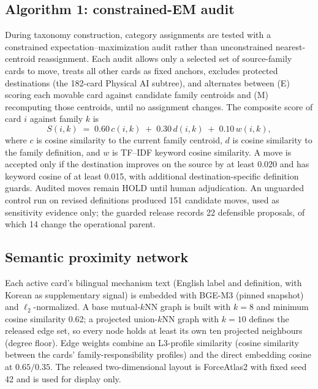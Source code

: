 \documentclass[fleqn,10pt]{wlscirep}
\begin{document}
\subsection*{Algorithm 1: constrained-EM audit}

During taxonomy construction, category assignments are tested with a
constrained expectation--maximization audit rather than unconstrained
nearest-centroid reassignment. Each audit allows only a selected set of
source-family cards to move, treats all other cards as fixed anchors,
excludes protected destinations (the 182-card Physical AI subtree), and
alternates between (E) scoring each movable card against candidate family
centroids and (M) recomputing those centroids, until no assignment changes.
The composite score of card $i$ against family $k$ is
\begin{equation}
S(i,k) \;=\; 0.60\,c(i,k) \;+\; 0.30\,d(i,k) \;+\; 0.10\,w(i,k),
\end{equation}
where $c$ is cosine similarity to the current family centroid, $d$ is cosine
similarity to the family definition, and $w$ is TF--IDF keyword cosine
similarity. A move is accepted only if the destination improves on the source
by at least 0.020 and has keyword cosine of at least 0.015, with additional
destination-specific definition guards. Audited moves remain HOLD until
human adjudication. An unguarded control run on revised definitions produced
151 candidate moves, used as sensitivity evidence only; the guarded release
records 22 defensible proposals, of which 14 change the operational parent.

\subsection*{Semantic proximity network}

Each active card's bilingual mechanism text (English label and definition,
with Korean as supplementary signal) is embedded with BGE-M3\cite{chen2024bgem3}
(pinned snapshot) and $\ell_2$-normalized. A base mutual-$k$NN graph is built
with $k=8$ and minimum cosine similarity 0.62; a projected union-$k$NN graph
with $k=10$ defines the released edge set, so every node holds at least its
own ten projected neighbours (degree floor). Edge weights combine an
L3-profile similarity (cosine similarity between the cards'
family-responsibility profiles) and the direct embedding cosine at
$0.65/0.35$. The released two-dimensional layout is ForceAtlas2\cite{jacomy2014}
with fixed seed 42 and is used for display only.
\end{document}
